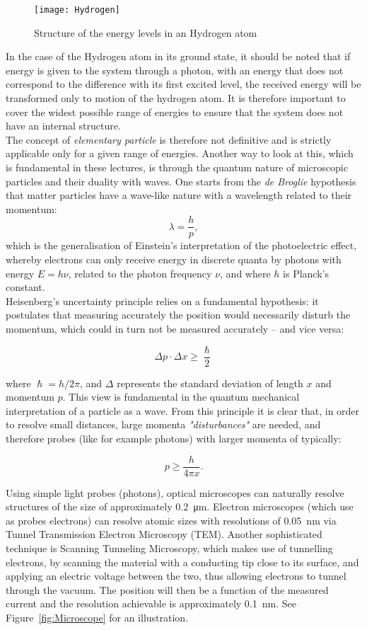\begin{figure}
  \centering
  \texttt{[image: Hydrogen]}
\caption{Structure of the energy levels in an Hydrogen atom}  \label{fig:Hydrogen}
\end{figure}{}

In the case of the Hydrogen atom in its ground state, it should be noted that if energy is given to the system through a photon, with an energy that does not correspond to the difference with its first excited level, the received energy will be transformed only to motion of the hydrogen atom. It is therefore important to cover the widest possible range of energies to ensure that the system does not have an internal structure. \\

The concept of {\it elementary particle} is therefore not definitive and is strictly applicable only for a given range of energies. 
Another way to look at this, which is fundamental in these lectures, is through the quantum nature of microscopic particles and their duality with waves. One starts from the {\it de Broglie} hypothesis that matter particles have a wave-like nature with a wavelength related to their momentum:
$$ \lambda = \frac{h}{p}, $$
which is the generalisation of Einstein's interpretation of the photoelectric effect, whereby electrons can only receive energy in discrete quanta by photons with energy $E = h \nu$, related to the photon frequency $\nu$, and where $h$ is Planck's constant. \\

Heisenberg's uncertainty principle relies on a fundamental hypothesis: it postulates that measuring accurately the position would necessarily disturb the momentum, which could in turn not be measured accurately -- and vice versa:

$$ \Delta p \cdot \Delta x \geq \frac{\hslash}{2}$$

\noindent where $\hslash = h/2\pi$, and $\Delta$ represents the standard deviation of length $x$ and momentum $p$. This view is fundamental in the quantum mechanical interpretation of a particle as a wave. From this principle it is clear that, in order to resolve small distances, large momenta {\it "disturbances"} are needed, and therefore probes (like for example photons) with larger momenta of typically:

$$ p \geq \frac{h}{4\pi x}.$$

Using simple light probes (photons), optical microscopes can naturally resolve structures of the size of approximately \SI{0.2}{\micro\meter}. Electron microscopes (which use as probes electrons) can resolve atomic sizes with resolutions of \SI{0.05}{nm} via Tunnel Transmission Electron Microscopy (TEM). Another sophisticated technique is Scanning Tunneling Microscopy, which makes use of tunnelling electrons, by scanning the material with a conducting tip close to its surface, and applying an electric voltage between the two, thus allowing electrons to tunnel through the vacuum. The position will then be a function of the measured current and the resolution achievable is approximately \SI{0.1}{nm}. See Figure~\ref{fig:Microscope} for an illustration.

